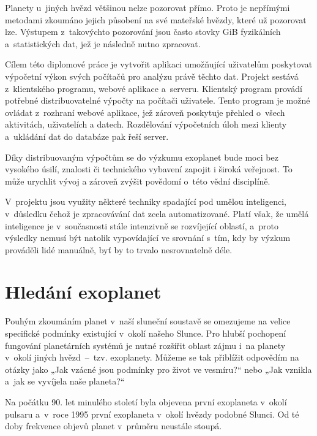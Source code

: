 \documentclass[a4paper,12pt]{article}
\begin{document}
Planety u~jiných hvězd většinou nelze pozorovat přímo. Proto je nepřímými metodami zkoumáno jejich působení na své mateřské hvězdy, které už pozorovat lze. Výstupem z~takovýchto pozorování jsou často stovky GiB fyzikálních a~statistických dat, jež je následně nutno zpracovat.~\cite{exoplanets}

Cílem této diplomové práce je vytvořit aplikaci umožňující uživatelům poskytovat výpočetní výkon svých počítačů pro analýzu právě těchto dat. Projekt sestává z~klientského programu, webové aplikace a~serveru. Klientský program provádí potřebné distribuovatelné výpočty na počítači uživatele. Tento program je možné ovládat z~rozhraní webové aplikace, jež zároveň poskytuje přehled o~všech aktivitách, uživatelích a datech. Rozdělování výpočetních úloh mezi klienty a~ukládání dat do databáze pak řeší server.

Díky distribuovaným výpočtům se do výzkumu exoplanet bude moci bez vysokého úsilí, znalosti či technického vybavení zapojit i široká veřejnost. To může urychlit vývoj a zároveň zvýšit povědomí o~této vědní disciplíně.

V~projektu jsou využity některé techniky spadající pod umělou inteligenci, v~důsledku čehož je zpracovávání dat zcela automatizované. Platí však, že umělá inteligence je v~současnosti stále intenzivně se rozvíjející oblastí, a~proto výsledky nemusí být natolik vypovídající ve srovnání s~tím, kdy by výzkum prováděli lidé manuálně, byť by to trvalo nesrovnatelně déle.

\section{Hledání exoplanet}

Pouhým zkoumáním planet v~naší sluneční soustavě se omezujeme na velice specifické podmínky existující v~okolí našeho Slunce. Pro hlubší pochopení fungování planetárních systémů je nutné rozšířit oblast zájmu i~na planety v~okolí jiných hvězd~--~tzv. exoplanety. Můžeme se tak přiblížit odpovědím na otázky jako „Jak vzácné jsou podmínky pro život ve vesmíru?“ nebo „Jak vznikla a~jak se vyvíjela naše planeta?“~\cite{exoplanets}

Na počátku 90. let minulého století byla objevena první exoplaneta v~okolí pulsaru a~v~roce 1995 první exoplaneta v~okolí hvězdy podobné Slunci. Od té doby frekvence objevů planet v~průměru neustále stoupá.~\cite{exoplanets,nasadata}

\end{document}
